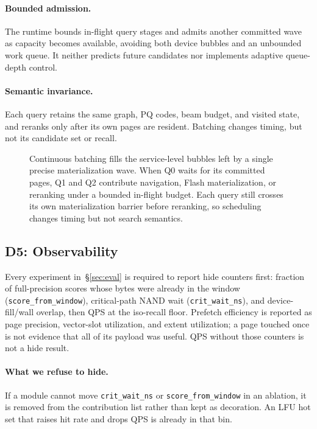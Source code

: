 \paragraph{Bounded admission.}
The runtime bounds in-flight query stages and admits another committed wave as
capacity becomes available, avoiding both device bubbles and an unbounded work
queue.
It neither predicts future candidates nor implements adaptive queue-depth
control.

\paragraph{Semantic invariance.}
Each query retains the same graph, PQ codes, beam budget, and visited state, and
reranks only after its own pages are resident.
Batching changes timing, but not its candidate set or recall.

\begin{figure}[t]
  \centering
  \resizebox{0.98\textwidth}{!}{}
  \caption{Continuous batching fills the service-level bubbles left by a
    single precise materialization wave.
    When Q0 waits for its committed pages, Q1 and Q2 contribute navigation,
    Flash materialization, or reranking under a bounded in-flight budget.
    Each query still crosses its own materialization barrier before reranking,
    so scheduling changes timing but not search semantics.}
  \label{fig:design-pipe}
\end{figure}

\subsection{D5: Observability}
\label{sec:d5}

Every experiment in~\S\ref{sec:eval} is required to report hide counters first: fraction of full-precision scores whose bytes were already in the window (\texttt{score\_from\_window}), critical-path NAND wait (\texttt{crit\_wait\_ns}), and device-fill/wall overlap, then QPS at the iso-recall floor.
Prefetch efficiency is reported as page precision, vector-slot utilization, and extent utilization; a page touched once is not evidence that all of its payload was useful.
QPS without those counters is not a hide result.

\paragraph{What we refuse to hide.}
If a module cannot move \texttt{crit\_wait\_ns} or \texttt{score\_from\_window} in an ablation, it is removed from the contribution list rather than kept as decoration.
An LFU hot set that raises hit rate and drops QPS is already in that bin.

